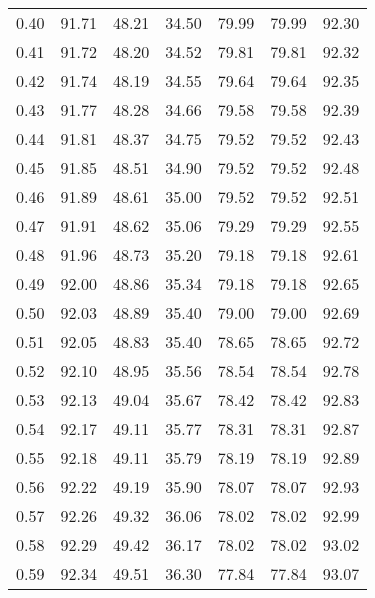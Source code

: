 \begin{tabular}{|c|c|c|c|c|c|c|}
      0.40 &     91.71 &     48.21 &      34.50 &   79.99 &      79.99 &         92.30 \\
      0.41 &     91.72 &     48.20 &      34.52 &   79.81 &      79.81 &         92.32 \\
      0.42 &     91.74 &     48.19 &      34.55 &   79.64 &      79.64 &         92.35 \\
      0.43 &     91.77 &     48.28 &      34.66 &   79.58 &      79.58 &         92.39 \\
      0.44 &     91.81 &     48.37 &      34.75 &   79.52 &      79.52 &         92.43 \\
      0.45 &     91.85 &     48.51 &      34.90 &   79.52 &      79.52 &         92.48 \\
      0.46 &     91.89 &     48.61 &      35.00 &   79.52 &      79.52 &         92.51 \\
      0.47 &     91.91 &     48.62 &      35.06 &   79.29 &      79.29 &         92.55 \\
      0.48 &     91.96 &     48.73 &      35.20 &   79.18 &      79.18 &         92.61 \\
      0.49 &     92.00 &     48.86 &      35.34 &   79.18 &      79.18 &         92.65 \\
      0.50 &     92.03 &     48.89 &      35.40 &   79.00 &      79.00 &         92.69 \\
      0.51 &     92.05 &     48.83 &      35.40 &   78.65 &      78.65 &         92.72 \\
      0.52 &     92.10 &     48.95 &      35.56 &   78.54 &      78.54 &         92.78 \\
      0.53 &     92.13 &     49.04 &      35.67 &   78.42 &      78.42 &         92.83 \\
      0.54 &     92.17 &     49.11 &      35.77 &   78.31 &      78.31 &         92.87 \\
      0.55 &     92.18 &     49.11 &      35.79 &   78.19 &      78.19 &         92.89 \\
      0.56 &     92.22 &     49.19 &      35.90 &   78.07 &      78.07 &         92.93 \\
      0.57 &     92.26 &     49.32 &      36.06 &   78.02 &      78.02 &         92.99 \\
      0.58 &     92.29 &     49.42 &      36.17 &   78.02 &      78.02 &         93.02 \\
      0.59 &     92.34 &     49.51 &      36.30 &   77.84 &      77.84 &         93.07 \\

\end{tabular}
